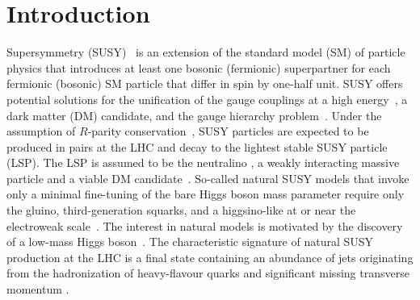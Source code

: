\maketitle


\section{Introduction}
\label{sec:introduction}

Supersymmetry (SUSY)~\cite{ref:SUSY-1, ref:SUSY0, ref:SUSY3,
  ref:SUSY1} is an extension of the standard model (SM) of particle
physics that introduces at least one bosonic (fermionic) superpartner
for each fermionic (bosonic) SM particle that differ in spin by
one-half unit. SUSY offers potential solutions for the unification of
the gauge couplings at a high energy~\cite{Dimopoulos:1981yj,
  Ibanez:1981yh, Marciano:1981un}, a dark matter (DM) candidate, and
the gauge hierarchy problem~\cite{ref:hierarchy1,
  ref:hierarchy2}. Under the assumption of $R$-parity
conservation~\cite{Farrar:1978xj}, SUSY particles are expected to be
produced in pairs at the LHC and decay to the lightest stable SUSY
particle (LSP). The LSP is assumed to be the neutralino \PSGczDo, a
weakly interacting massive particle and a viable DM
candidate~\cite{Jungman:1995df, 1674-1137-38-9-090001}.  So-called
natural SUSY models that invoke only a minimal fine-tuning of the bare
Higgs boson mass parameter require only the gluino, third-generation
squarks, and a higgsino-like \PSGczDo at or near the electroweak
scale~\cite{ref:barbierinsusy}. The interest in natural models is
motivated by the discovery of a low-mass Higgs
boson~\cite{Aad:2012tfa, Chatrchyan:2012ufa, Chatrchyan:2013lba,
  Khachatryan:2014jba, Aad:2014aba, Aad:2015zhl}. The characteristic
signature of natural SUSY production at the LHC is a final state
containing an abundance of jets originating from the hadronization of
heavy-flavour quarks and significant missing transverse momentum
\ptvecmiss.


